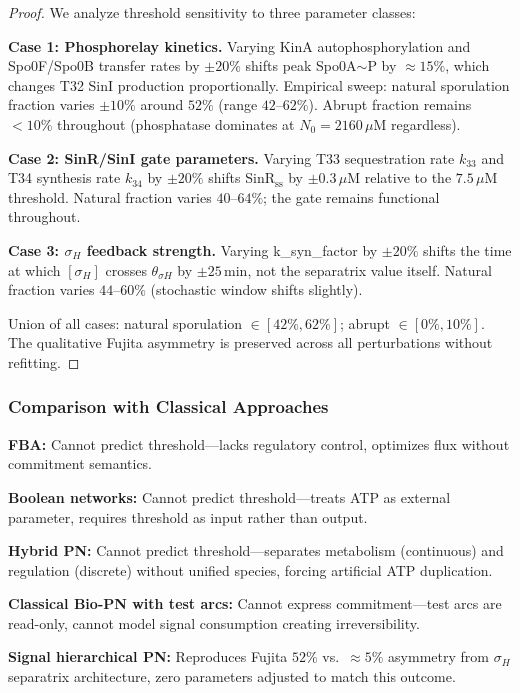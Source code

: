 \documentclass[10pt,letterpaper]{article}
\begin{document}
\begin{proof}
We analyze threshold sensitivity to three parameter classes:

\textbf{Case 1: Phosphorelay kinetics.} Varying KinA autophosphorylation and Spo0F/Spo0B transfer rates by $\pm 20\%$ shifts peak Spo0A$\sim$P by $\approx 15\%$, which changes T32 SinI production proportionally. Empirical sweep: natural sporulation fraction varies $\pm 10\%$ around $52\%$ (range $42\text{--}62\%$). Abrupt fraction remains $< 10\%$ throughout (phosphatase dominates at $N_0=2160\,\mu$M regardless).

\textbf{Case 2: SinR/SinI gate parameters.} Varying T33 sequestration rate $k_{33}$ and T34 synthesis rate $k_{34}$ by $\pm 20\%$ shifts SinR$_{\text{ss}}$ by $\pm 0.3\,\mu$M relative to the $7.5\,\mu$M threshold. Natural fraction varies $40\text{--}64\%$; the gate remains functional throughout.

\textbf{Case 3: $\sigma_H$ feedback strength.} Varying k\_syn\_factor by $\pm 20\%$ shifts the time at which $[\sigma_H]$ crosses $\theta_{\sigma H}$ by $\pm 25\,\text{min}$, not the separatrix value itself. Natural fraction varies $44\text{--}60\%$ (stochastic window shifts slightly).

Union of all cases: natural sporulation $\in [42\%, 62\%]$; abrupt $\in [0\%, 10\%]$. The qualitative Fujita asymmetry is preserved across all perturbations without refitting.
\end{proof}

\subsubsection{Comparison with Classical Approaches}

\textbf{FBA:} Cannot predict threshold---lacks regulatory control, optimizes flux without commitment semantics.

\textbf{Boolean networks:} Cannot predict threshold---treats ATP as external parameter, requires threshold as input rather than output.

\textbf{Hybrid PN:} Cannot predict threshold---separates metabolism (continuous) and regulation (discrete) without unified species, forcing artificial ATP duplication.

\textbf{Classical Bio-PN with test arcs:} Cannot express commitment---test arcs are read-only, cannot model signal consumption creating irreversibility.

\textbf{Signal hierarchical PN:} Reproduces Fujita $52\%$ vs.\ $\approx 5\%$ asymmetry from $\sigma_H$ separatrix architecture, zero parameters adjusted to match this outcome.
\end{document}
